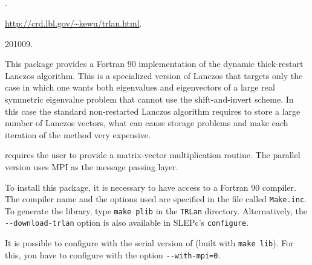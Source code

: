 \subsection*{\underline{\trlan}}
	\begin{description}
	\setlength{\itemsep}{0pt}
	\item[References.]\citep{Wu:2000:TLM}.
	\item[Website.] \url{http://crd.lbl.gov/\~kewu/trlan.html}.
	\item[Version.] 201009.
	\item[Summary.] This package provides a Fortran 90 implementation of the dynamic thick-restart Lanczos algorithm. This is a specialized version of Lanczos that targets only the case in which one wants both eigenvalues and eigenvectors of a large real symmetric eigenvalue problem that cannot use the shift-and-invert scheme. In this case the standard non-restarted Lanczos algorithm requires to store a large number of Lanczos vectors, what can cause storage problems and make each iteration of the method very expensive.

	\trlan{} requires the user to provide a matrix-vector multiplication routine. The parallel version uses MPI as the message passing layer.
	\item[Installation.] To install this package, it is necessary to have access to a Fortran 90 compiler. The compiler name and the options used are specified in the file called \texttt{Make.inc}. To generate the library, type \texttt{make plib} in the \texttt{TRLan} directory. Alternatively, the \texttt{-{}-download-trlan} option is also available in SLEPc's \texttt{configure}.

	It is possible to configure \slepc with the serial version of \trlan (built with \texttt{make lib}). For this, you have to configure \petsc with the option \texttt{-{}-with-mpi=0}.
	\end{description}

